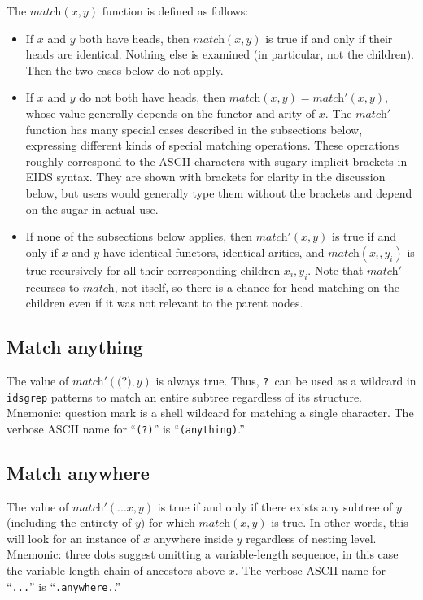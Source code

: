 \documentclass[twocolumn]{report}
\begin{document}
The $\textit{match}(x,y)$ function is defined as follows:
\begin{itemize}
  \item If $x$ and $y$ both have heads, then $\textit{match}(x,y)$ is true
    if and only if their heads are identical.  Nothing else is examined (in
    particular, not the children).  Then the two cases below do not apply.
  \item If $x$ and $y$ do not both have heads, then
    $\textit{match}(x,y)=\textit{match}'(x,y)$, whose value
    generally depends on the functor and arity of $x$.  The
    $\textit{match}'$ function has many special cases described in the
    subsections below, expressing different kinds of special matching
    operations.  These operations roughly correspond to the ASCII
    characters with sugary implicit brackets in EIDS syntax.  They are
    shown with brackets for clarity in the discussion below, but users
    would generally type them without the brackets and depend on the
    sugar in actual use.
  \item If none of the subsections below applies, then
    $\textit{match}'(x,y)$ is true if and only if $x$ and $y$ have identical
    functors, identical arities, and $\textit{match}(x_i,y_i)$ is true
    recursively for all their corresponding children $x_i,y_i$.  Note that
    $\textit{match}'$ recurses to $\textit{match}$, not itself, so
    there is a chance for head matching on the children even if it was
    not relevant to the parent nodes.
\end{itemize}

\subsection{Match anything}

The value of $\textit{match}'(\texttt{(?)},y)$ is always true.  Thus,
\texttt{?}\ can be used as a wildcard in \texttt{idsgrep} patterns to match
an entire subtree regardless of its structure.  Mnemonic:  question mark
is a shell wildcard for matching a single character.
The verbose ASCII name for ``\texttt{(?)}'' is ``\texttt{(anything)}.''

\subsection{Match anywhere}

The value of $\textit{match}'(\texttt{...}x,y)$ is true if and only if there
exists any subtree of $y$ (including the entirety of $y$) for which
$\textit{match}(x,y)$ is true.  In other words, this will look for an
instance of $x$ anywhere inside $y$ regardless of nesting level.  Mnemonic:
three dots suggest omitting a variable-length sequence, in this case the
variable-length chain of ancestors above $x$.
The verbose ASCII name for ``\texttt{...}'' is ``\texttt{.anywhere.}.''
\end{document}
